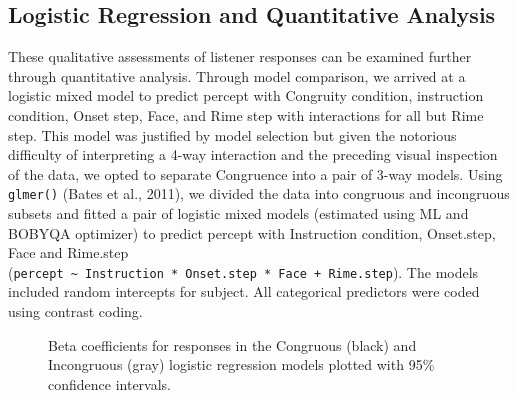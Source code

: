 \documentclass[
  letterpaper,
  DIV=11,
  numbers=noendperiod]{scrartcl}
\begin{document}
\subsection{Logistic Regression and Quantitative
Analysis}\label{sec-results-stats}

These qualitative assessments of listener responses can be examined
further through quantitative analysis. Through model comparison, we
arrived at a logistic mixed model to predict percept with Congruity
condition, instruction condition, Onset step, Face, and Rime step with
interactions for all but Rime step. This model was justified by model
selection but given the notorious difficulty of interpreting a 4-way
interaction and the preceding visual inspection of the data, we opted to
separate Congruence into a pair of 3-way models. Using \texttt{glmer()}
(Bates et al., 2011), we divided the data into congruous and incongruous
subsets and fitted a pair of logistic mixed models (estimated using ML
and BOBYQA optimizer) to predict percept with Instruction condition,
Onset.step, Face and Rime.step
(\texttt{percept\ \textasciitilde{}\ Instruction\ *\ Onset.step\ *\ Face\ +\ Rime.step}).
The models included random intercepts for subject. All categorical
predictors were coded using contrast coding.

\begin{figure}


\caption{\label{fig-coefs}Beta coefficients for responses in the
Congruous (black) and Incongruous (gray) logistic regression models
plotted with 95\% confidence intervals.}

\end{figure}%
\end{document}
